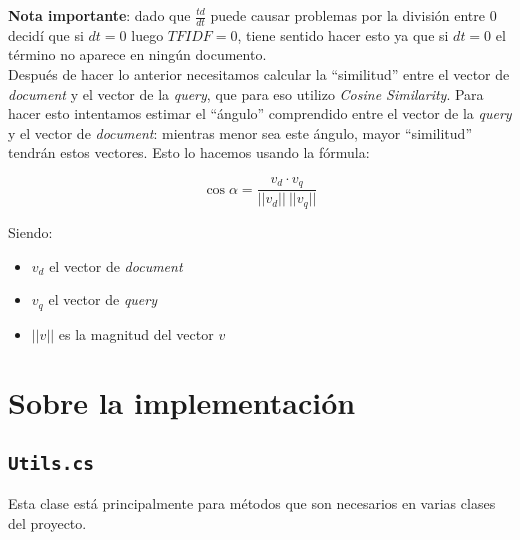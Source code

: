\documentclass{report}
\begin{document}
{\bf \color{red} Nota importante}: dado que $\frac{td}{dt}$ puede causar problemas por la 
división entre $0$ decidí que si $dt = 0$ luego $TFIDF = 0$, tiene sentido hacer esto ya 
que si $dt = 0$ el término no aparece en ningún documento.\\

Después de hacer lo anterior necesitamos calcular la ``similitud'' entre el vector de 
{\it document} y el vector de la {\it query}, que para eso utilizo 
{\it Cosine Similarity}. 
Para hacer esto intentamos estimar el ``ángulo'' comprendido entre el vector de la 
{\it query} y el vector de {\it document}: mientras menor sea este ángulo, mayor 
``similitud'' tendrán estos vectores. Esto lo hacemos usando la fórmula:

\[\cos \alpha = \frac{v_d \cdot v_q}{||v_d|| ~ ||v_q||}\]

Siendo:

\begin{itemize}
 \item $v_d$ el vector de {\it document}
 \item $v_q$ el vector de {\it query}
 \item $||v||$ es la magnitud del vector $v$
\end{itemize}

\section*{Sobre la implementaci\'on}

\subsection*{\tt Utils.cs}

Esta clase est\'a principalmente para m\'etodos que son necesarios en varias clases del
proyecto.
\end{document}
